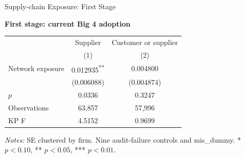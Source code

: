 \documentclass[10pt]{article}
\newcommand{\sym}[1]{\textsuperscript{#1}}
\begin{document}
\fontsize{10}{12}\selectfont
\setlength{\tabcolsep}{3pt}\renewcommand{\arraystretch}{1.15}
\begin{center}\large Supply-chain Exposure: First Stage\end{center}
\medskip\textbf{First stage: current Big 4 adoption}\par\smallskip
\begin{tabular*}{\textwidth}{@{\extracolsep{\fill}}lcc@{}}
\toprule
 & Supplier & Customer or supplier \\
 & (1) & (2) \\
\midrule
Network exposure & 0.012935\sym{**} & 0.004800 \\
 & (0.006088) & (0.004874) \\
$p$ & 0.0336 & 0.3247 \\
Observations & 63,857 & 57,996 \\
KP F & 4.5152 & 0.9699 \\
\bottomrule\end{tabular*}\par
\medskip\fontsize{9}{11}\selectfont\textit{Notes:} SE clustered by firm. Nine audit-failure controls and mis\_dummy. * $p<0.10$, ** $p<0.05$, *** $p<0.01$.
\end{document}
